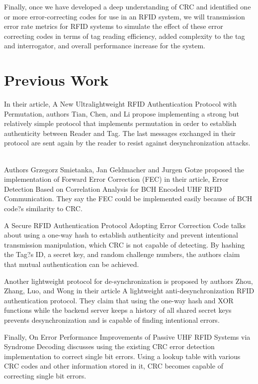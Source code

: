 \documentclass{sigcomm-alternate}
\begin{document}
Finally, once we have developed a deep understanding of CRC and identified one or more error-correcting codes for use in an RFID system, we will transmission error rate metrics for RFID systems to simulate the effect of these error correcting codes in terms of tag reading efficiency, added complexity to the tag and interrogator, and overall performance increase for the system.

\section{Previous Work}
In their article, A New Ultralightweight RFID Authentication Protocol with Permutation, authors Tian, Chen, and Li propose implementing a strong but relatively simple protocol that implements permutation in order to establish authenticity between Reader and Tag. The last messages exchanged in their protocol are sent again by the reader to resist against desynchronization attacks. ~\cite{3}

Authors Grzegorz Smietanka, Jan Geldmacher and Jurgen Gotze proposed the implementation of Forward Error Correction (FEC) in their article, Error Detection Based on Correlation Analysis for BCH Encoded UHF RFID Communication. They say the FEC could be implemented easily because of BCH code?s similarity to CRC. \cite{1}

A Secure RFID Authentication Protocol Adopting Error Correction Code talks about using a one-way hash to establish authenticity and prevent intentional transmission manipulation, which CRC is not capable of detecting. By hashing the Tag?s ID, a secret key, and random challenge numbers, the authors claim that mutual authentication can be achieved. \cite{5}

Another lightweight protocol for de-synchronization is proposed by authors Zhou, Zhang, Luo, and Wong in their article A lightweight anti-desynchronization RFID authentication protocol. They claim that using the one-way hash and XOR functions while the backend server keeps a history of all shared secret keys prevents desynchronization and is capable of finding intentional errors. \cite{4}

Finally, On Error Performance Improvements of Passive UHF RFID Systems via Syndrome Decoding discusses using the existing CRC error detection implementation to correct single bit errors. Using a lookup table with various CRC codes and other information stored in it, CRC becomes capable of correcting single bit errors. \cite{2}
\end{document}
